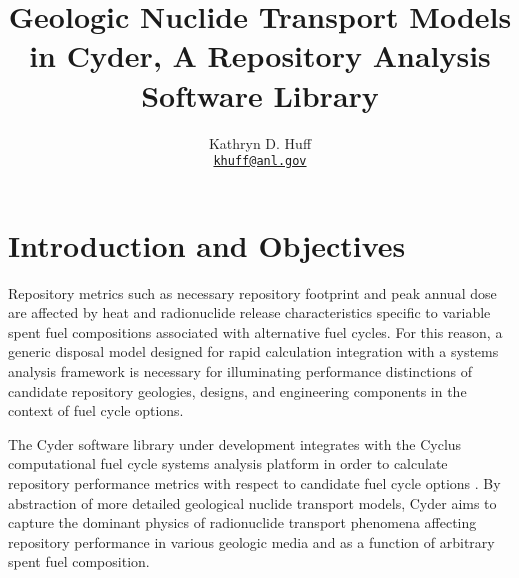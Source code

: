\documentclass[letterpaper]{article}
\author{Kathryn D. Huff
\\ \href{mailto:khuff@anl.gov}{\texttt{khuff@anl.gov}}
}
\date{}
\title{Geologic Nuclide Transport Models in Cyder, A Repository Analysis Software Library}
\begin{document}
\maketitle







\section{Introduction and Objectives}

Repository metrics such as necessary repository footprint and peak annual dose 
are affected by heat and radionuclide release characteristics specific to 
variable spent fuel compositions associated with alternative fuel cycles.  For 
this reason, a generic disposal model designed for rapid calculation integration with a systems 
analysis framework is necessary for illuminating performance distinctions of 
candidate repository geologies, designs, and engineering components in the 
context of fuel cycle options. 

The Cyder software library under development integrates with 
the Cyclus computational fuel cycle systems analysis platform in order to 
calculate repository performance metrics with respect to candidate fuel cycle 
options \cite{huff_cyder_2012,huff_cyclus:_2010}. By abstraction of more 
detailed geological nuclide transport models, Cyder aims to capture the dominant 
physics of radionuclide transport phenomena affecting repository performance in 
various geologic media and as a function of arbitrary spent fuel composition.
\end{document}
